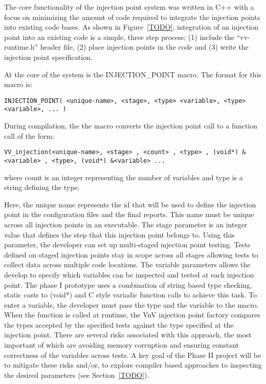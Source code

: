 The core functionality of the injection point system was written in C++ with a focus on minimizing the amount of 
code required to integrate the injection points into existing code bases. As shown in Figure~\ref{TODO}, integration of an injection point into an existing code is a simple, three step process; (1) include the ``vv-runtime.h'' header file, (2) place injection points in the code and (3) write the injection point specification. 

At the core of the system is the INJECTION\_POINT macro. The format for this macro is:

\begin{verbatim} 
INJECTION_POINT( <unique-name>, <stage>, <type> <variable>, <type> <variable>, ... )
\end{verbatim}

During compilation, the the macro converts the injection point call to a function call of the form:

\begin{verbatim}
VV_injection(<unique-name>, <stage> , <count> , <type> , (void*) &<variable> , <type>, (void*) &<variable> ...
\end{verbatim}
where count is an integer representing the number of variables and type is a string defining the type. 

Here, the unique name represents the id that will be used to define the injection point in the configuration files and the final reports. This name must 
be unique across all injection points in an executable. The stage parameter is an integer value that defines the step that this injection point belongs to. Using this parameter, the developer can set up multi-staged injection point testing. Tests defined on staged injection points stay in scope across 
all stages allowing tests to collect data across multiple code locations. The variable parameters allows the develop to specify which variables can be inspected and tested at each injection point. The phase I prototype uses a combination of string based type checking, static casts to (void*) and C style variadic function calls to achieve this task. To enter a variable, the developer must pass the type and the variable to the macro. When the function is called at runtime, the VnV injection point factory compares the types accepted by the specified tests against the type specified at the injection point. There are several risks associated with this approach, the most important of which are avoiding memory corruption and ensuring constant correctness of the variables across tests. A key goal of the Phase II project will be to mitigate these risks and/or, to explore compiler based approaches to inspecting the desired parameters (see Section~\ref{TODO}).

